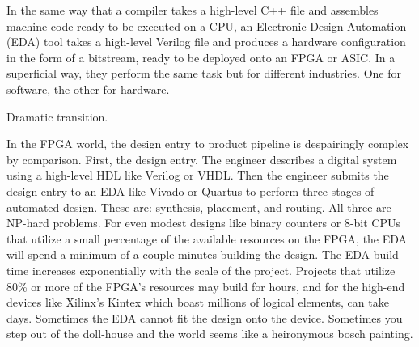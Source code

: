 \documentclass{article}
\begin{document}
In the same way that a compiler takes a high-level C++ file and assembles machine code ready to be executed on a CPU, an Electronic Design Automation (EDA) tool takes a high-level Verilog file and produces a hardware configuration in the form of a bitstream, ready to be deployed onto an FPGA or ASIC. In a superficial way, they perform the same task but for different industries. 
One for software, the other for hardware.

Dramatic transition.

In the FPGA world, the design entry to product pipeline is despairingly complex by comparison. 
First, the design entry. The engineer describes a digital system using a high-level HDL like Verilog or VHDL. 
Then the engineer submits the design entry to an EDA like Vivado or Quartus to perform three stages of automated design. 
These are: synthesis, placement, and routing. 
All three are NP-hard problems.
For even modest designs like binary counters or 8-bit CPUs that utilize a small percentage of the available resources on the FPGA, the EDA will spend a minimum of a couple minutes building the design.
The EDA build time increases exponentially with the scale of the project. 
Projects that utilize 80\% or more of the FPGA's resources may build for hours, and for the high-end devices like Xilinx's Kintex which boast millions of logical elements, can take days.
Sometimes the EDA cannot fit the design onto the device.
Sometimes you step out of the doll-house and the world seems like a heironymous bosch painting.
\end{document}

